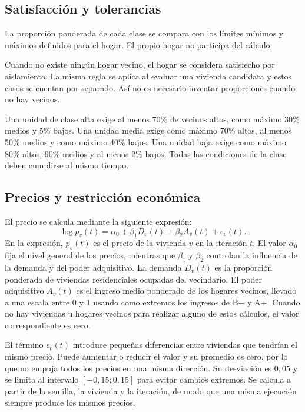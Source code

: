 \subsection{Satisfacción y tolerancias}

La proporción ponderada de cada clase se compara con los límites mínimos y máximos definidos para el hogar. El propio hogar no participa del cálculo.

Cuando no existe ningún hogar vecino, el hogar se considera satisfecho por aislamiento. La misma regla se aplica al evaluar una vivienda candidata y estos casos se cuentan por separado. Así no es necesario inventar proporciones cuando no hay vecinos.

Una unidad de clase alta exige al menos 70\% de vecinos altos, como máximo 30\% medios y 5\% bajos. Una unidad media exige como máximo 70\% altos, al menos 50\% medios y como máximo 40\% bajos. Una unidad baja exige como máximo 80\% altos, 90\% medios y al menos 2\% bajos. Todas las condiciones de la clase deben cumplirse al mismo tiempo.

\subsection{Precios y restricción económica}

El precio se calcula mediante la siguiente expresión:
\begin{equation}
\log p_v(t)=\alpha_0+\beta_1D_v(t)+\beta_2A_v(t)+\epsilon_v(t).
\end{equation}
En la expresión, $p_v(t)$ es el precio de la vivienda $v$ en la iteración $t$. El valor $\alpha_0$ fija el nivel general de los precios, mientras que $\beta_1$ y $\beta_2$ controlan la influencia de la demanda y del poder adquisitivo. La demanda $D_v(t)$ es la proporción ponderada de viviendas residenciales ocupadas del vecindario. El poder adquisitivo $A_v(t)$ es el ingreso medio ponderado de los hogares vecinos, llevado a una escala entre 0 y 1 usando como extremos los ingresos de B$-$ y A+. Cuando no hay viviendas u hogares vecinos para realizar alguno de estos cálculos, el valor correspondiente es cero.

El término $\epsilon_v(t)$ introduce pequeñas diferencias entre viviendas que tendrían el mismo precio. Puede aumentar o reducir el valor y su promedio es cero, por lo que no empuja todos los precios en una misma dirección. Su desviación es $0{,}05$ y se limita al intervalo $[-0{,}15;0{,}15]$ para evitar cambios extremos. Se calcula a partir de la semilla, la vivienda y la iteración, de modo que una misma ejecución siempre produce los mismos precios.


